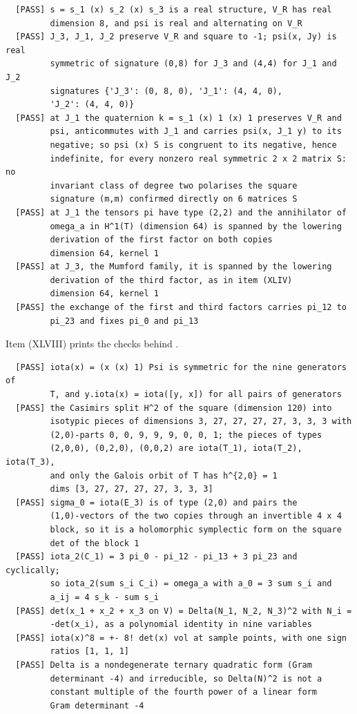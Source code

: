 \begin{small}
\begin{verbatim}
  [PASS] s = s_1 (x) s_2 (x) s_3 is a real structure, V_R has real
         dimension 8, and psi is real and alternating on V_R
  [PASS] J_3, J_1, J_2 preserve V_R and square to -1; psi(x, Jy) is real
         symmetric of signature (0,8) for J_3 and (4,4) for J_1 and J_2
         signatures {'J_3': (0, 8, 0), 'J_1': (4, 4, 0),
         'J_2': (4, 4, 0)}
  [PASS] at J_1 the quaternion k = s_1 (x) 1 (x) 1 preserves V_R and
         psi, anticommutes with J_1 and carries psi(x, J_1 y) to its
         negative; so psi (x) S is congruent to its negative, hence
         indefinite, for every nonzero real symmetric 2 x 2 matrix S: no
         invariant class of degree two polarises the square
         signature (m,m) confirmed directly on 6 matrices S
  [PASS] at J_1 the tensors pi have type (2,2) and the annihilator of
         omega_a in H^1(T) (dimension 64) is spanned by the lowering
         derivation of the first factor on both copies
         dimension 64, kernel 1
  [PASS] at J_3, the Mumford family, it is spanned by the lowering
         derivation of the third factor, as in item (XLIV)
         dimension 64, kernel 1
  [PASS] the exchange of the first and third factors carries pi_12 to
         pi_23 and fixes pi_0 and pi_13
\end{verbatim}
\end{small}

Item (XLVIII) prints the checks behind .

\begin{small}
\begin{verbatim}
  [PASS] iota(x) = (x (x) 1) Psi is symmetric for the nine generators of
         T, and y.iota(x) = iota([y, x]) for all pairs of generators
  [PASS] the Casimirs split H^2 of the square (dimension 120) into
         isotypic pieces of dimensions 3, 27, 27, 27, 27, 3, 3, 3 with
         (2,0)-parts 0, 0, 9, 9, 9, 0, 0, 1; the pieces of types
         (2,0,0), (0,2,0), (0,0,2) are iota(T_1), iota(T_2), iota(T_3),
         and only the Galois orbit of T has h^{2,0} = 1
         dims [3, 27, 27, 27, 27, 3, 3, 3]
  [PASS] sigma_0 = iota(E_3) is of type (2,0) and pairs the
         (1,0)-vectors of the two copies through an invertible 4 x 4
         block, so it is a holomorphic symplectic form on the square
         det of the block 1
  [PASS] iota_2(C_1) = 3 pi_0 - pi_12 - pi_13 + 3 pi_23 and cyclically;
         so iota_2(sum s_i C_i) = omega_a with a_0 = 3 sum s_i and
         a_ij = 4 s_k - sum s_i
  [PASS] det(x_1 + x_2 + x_3 on V) = Delta(N_1, N_2, N_3)^2 with N_i =
         -det(x_i), as a polynomial identity in nine variables
  [PASS] iota(x)^8 = +- 8! det(x) vol at sample points, with one sign
         ratios [1, 1, 1]
  [PASS] Delta is a nondegenerate ternary quadratic form (Gram
         determinant -4) and irreducible, so Delta(N)^2 is not a
         constant multiple of the fourth power of a linear form
         Gram determinant -4
\end{verbatim}
\end{small}

